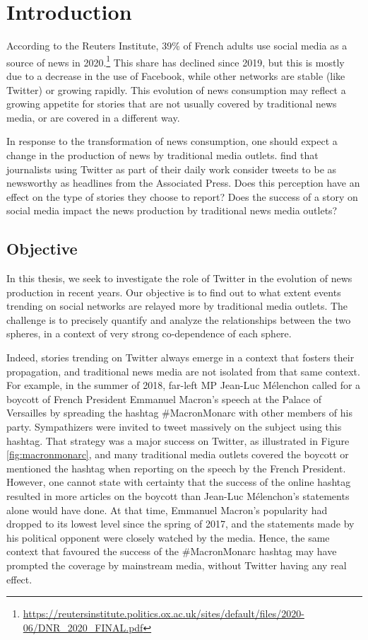 \chapter{Introduction}
According to the Reuters Institute, 39\% of French adults use social media as a source of news in 2020.\footnote{\url{https://reutersinstitute.politics.ox.ac.uk/sites/default/files/2020-06/DNR_2020_FINAL.pdf}}  This share has declined since 2019, but this is mostly due to a decrease in the use of Facebook, while other networks are stable (like Twitter) or growing rapidly. This evolution of news consumption may reflect a growing appetite for stories that are not usually covered by traditional news media, or are covered in a different way.


In response to the transformation of news consumption, one should expect a change in the production of news by traditional media outlets. \citet{mcgregor_twitter_2018} find that journalists using Twitter as part of their daily work consider tweets to be as newsworthy as headlines from the Associated Press. Does this perception have an effect on the type of stories they choose to report? Does the success of a story on social media impact the news production by traditional news media outlets?

\section{Objective}

In this thesis, we seek to investigate the role of Twitter in the evolution of news production in recent years. Our objective is to find out to what extent events trending on social networks are  relayed more by traditional media outlets. The challenge is to precisely quantify and analyze the relationships between the two spheres, in a context of very strong co-dependence of each sphere.

Indeed, stories trending on Twitter always emerge in a context that fosters their propagation, and traditional news media are not isolated from that same context. For example, in the summer of 2018, far-left MP Jean-Luc Mélenchon called for a boycott of French President Emmanuel Macron's speech at the Palace of Versailles by spreading the hashtag \#MacronMonarc with other members of his party. Sympathizers were invited to tweet massively on the subject using this hashtag. That strategy was a major success on Twitter, as illustrated in Figure \ref{fig:macronmonarc}, and many traditional media outlets covered the boycott or mentioned the hashtag when reporting on the speech by the French President. However, one cannot state with certainty that the success of the online hashtag resulted in more articles on the boycott than Jean-Luc Mélenchon's statements alone would have done. At that time, Emmanuel Macron's popularity had dropped to its lowest level since the spring of 2017, and the statements made by his political opponent were closely watched by the media. Hence, the same context that favoured the success of the \#MacronMonarc hashtag may have prompted the coverage by mainstream media, without Twitter having any real effect. 

